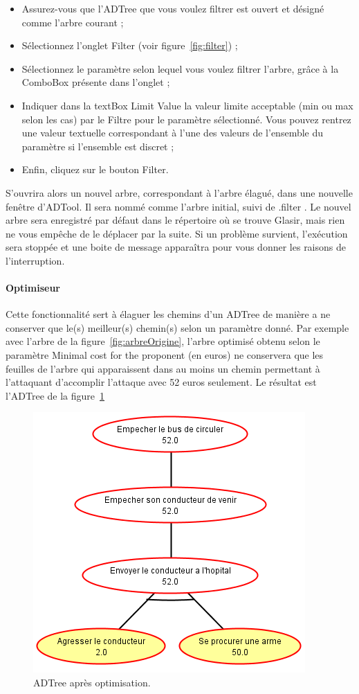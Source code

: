 \begin{itemize}
\item Assurez-vous que l'ADTree que vous voulez filtrer est ouvert et désigné comme l'arbre courant ;
\item Sélectionnez l'onglet \og Filter \fg{} (voir {\sc figure}~\ref{fig:filter}) ;
\item Sélectionnez le paramètre selon lequel vous voulez filtrer l'arbre, grâce à la ComboBox présente dans l'onglet ;
\item Indiquer dans la textBox \og Limit Value \fg{} la valeur limite acceptable (min ou max selon les cas) par le Filtre pour le paramètre sélectionné. Vous pouvez rentrez une valeur textuelle correspondant à l'une des valeurs de l'ensemble du paramètre si l'ensemble est discret ;
\item Enfin, cliquez sur le bouton \og Filter\fg{}.
\end{itemize}

S'ouvrira alors un nouvel arbre, correspondant à l'arbre élagué, dans une nouvelle fenêtre d'ADTool. Il sera nommé comme l'arbre initial, suivi de \og .filter \fg{}. Le nouvel arbre sera enregistré par défaut dans le répertoire où se trouve Glasir, mais rien ne vous empêche de le déplacer par la suite.
Si un problème survient, l'exécution sera stoppée et une boite de message apparaîtra pour vous donner les raisons de l'interruption.

\paragraph{Optimiseur} Cette fonctionnalité sert à élaguer les chemins d'un ADTree de manière a ne conserver que le(s) meilleur(s) chemin(s) selon un paramètre donné. Par exemple avec l'arbre de la {\sc figure}~\ref{fig:arbreOrigine}, l'arbre optimisé obtenu selon le paramètre \og Minimal cost for the proponent \fg (en euros) ne conservera que les feuilles de l'arbre qui apparaissent dans au moins un chemin permettant à l'attaquant d'accomplir l'attaque avec 52 euros seulement. Le résultat est l'ADTree de la {\sc figure}~\ref{fig:arbreOptim}

 \begin{figure}[H]
        \centering
        \includegraphics[height=0.5\textwidth]{figure/arbreOptimise.png}
        \caption{ADTree après optimisation.}
        \label{fig:arbreOptim}
    \end{figure}

